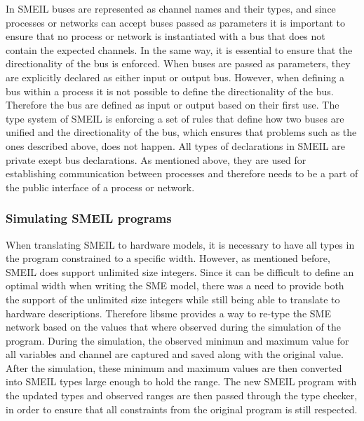 In SMEIL buses are represented as channel names and their types, and since processes or networks can accept buses passed as parameters it is important to ensure that no process or network is instantiated with a bus that does not contain the expected channels.
In the same way, it is essential to ensure that the directionality of the bus is enforced. When buses are passed as parameters, they are explicitly declared as either input or output bus. However, when defining a bus within a process it is not possible to define the directionality of the bus. Therefore the bus are defined as input or output based on their first use.
The type system of SMEIL is enforcing a set of rules that define how two buses are unified and the directionality of the bus, which ensures that problems such as the ones described above, does not happen.
All types of declarations in SMEIL are private exept bus declarations. As mentioned above, they are used for establishing communication between processes and therefore needs to be a part of the public interface of a process or network.

\subsubsection{Simulating SMEIL programs}
When translating SMEIL to hardware models, it is necessary to have all types in the program constrained to a specific width. However, as mentioned before, SMEIL does support unlimited size integers. Since it can be difficult to define an optimal width when writing the SME model, there was a need to provide both the support of the unlimited size integers while still being able to translate to hardware descriptions.
Therefore libsme provides a way to re-type the SME network based on the values that where observed during the simulation of the program.
During the simulation, the observed minimun and maximum value for all variables and channel are captured and saved along with the original value.
After the simulation, these minimum and maximum values are then converted into SMEIL types large enough to hold the range.
The new SMEIL program with the updated types and observed ranges are then passed through the type checker, in order to ensure that all constraints from the original program is still respected.

